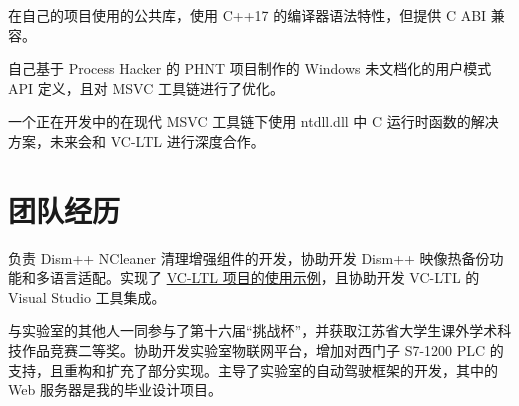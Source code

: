 \documentclass{resume}
\begin{document}
在自己的项目使用的公共库，使用 C++17 的编译器语法特性，但提供 C ABI 兼容。

自己基于 Process Hacker 的 PHNT 项目制作的 Windows 未文档化的用户模式 API 定义，且对 MSVC 工具链进行了优化。

一个正在开发中的在现代 MSVC 工具链下使用 ntdll.dll 中 C 运行时函数的解决方案，未来会和 VC-LTL 进行深度合作。

\section{团队经历}

负责 Dism++ NCleaner 清理增强组件的开发，协助开发 Dism++ 映像热备份功能和多语言适配。实现了 \href{https://github.com/Chuyu-Team/vc-ltl-samples}{VC-LTL 项目的使用示例}，且协助开发 VC-LTL 的 Visual Studio 工具集成。

与实验室的其他人一同参与了第十六届“挑战杯”，并获取江苏省大学生课外学术科技作品竞赛二等奖。协助开发实验室物联网平台，增加对西门子 S7-1200 PLC 的支持，且重构和扩充了部分实现。主导了实验室的自动驾驶框架的开发，其中的 Web 服务器是我的毕业设计项目。
\end{document}
